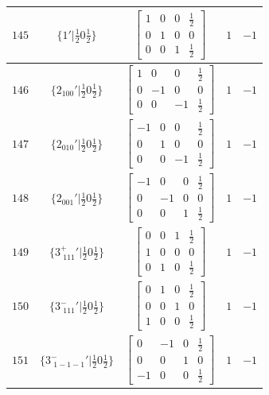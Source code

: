 \documentclass[fleqn,8pt]{jsarticle}
\begin{document}
\begin{longtable}{ccccc}
$ 145 $ & $ \{1{}'|\frac{1}{2} 0 \frac{1}{2}\} $ & $ \begin{bmatrix} 1 & 0 & 0 & \frac{1}{2} \\ 0 & 1 & 0 & 0 \\ 0 & 0 & 1 & \frac{1}{2} \end{bmatrix} $ & $ 1 $ & $ -1 $ \\ \hline
$ 146 $ & $ \{2{}_{100}{}'|\frac{1}{2} 0 \frac{1}{2}\} $ & $ \begin{bmatrix} 1 & 0 & 0 & \frac{1}{2} \\ 0 & -1 & 0 & 0 \\ 0 & 0 & -1 & \frac{1}{2} \end{bmatrix} $ & $ 1 $ & $ -1 $ \\ \hline
$ 147 $ & $ \{2{}_{010}{}'|\frac{1}{2} 0 \frac{1}{2}\} $ & $ \begin{bmatrix} -1 & 0 & 0 & \frac{1}{2} \\ 0 & 1 & 0 & 0 \\ 0 & 0 & -1 & \frac{1}{2} \end{bmatrix} $ & $ 1 $ & $ -1 $ \\ \hline
$ 148 $ & $ \{2{}_{001}{}'|\frac{1}{2} 0 \frac{1}{2}\} $ & $ \begin{bmatrix} -1 & 0 & 0 & \frac{1}{2} \\ 0 & -1 & 0 & 0 \\ 0 & 0 & 1 & \frac{1}{2} \end{bmatrix} $ & $ 1 $ & $ -1 $ \\ \hline
$ 149 $ & $ \{3^{+}_{\,\,111}{}'|\frac{1}{2} 0 \frac{1}{2}\} $ & $ \begin{bmatrix} 0 & 0 & 1 & \frac{1}{2} \\ 1 & 0 & 0 & 0 \\ 0 & 1 & 0 & \frac{1}{2} \end{bmatrix} $ & $ 1 $ & $ -1 $ \\ \hline
$ 150 $ & $ \{3^{-}_{\,\,111}{}'|\frac{1}{2} 0 \frac{1}{2}\} $ & $ \begin{bmatrix} 0 & 1 & 0 & \frac{1}{2} \\ 0 & 0 & 1 & 0 \\ 1 & 0 & 0 & \frac{1}{2} \end{bmatrix} $ & $ 1 $ & $ -1 $ \\ \hline
$ 151 $ & $ \{3^{-}_{\,\,1-1-1}{}'|\frac{1}{2} 0 \frac{1}{2}\} $ & $ \begin{bmatrix} 0 & -1 & 0 & \frac{1}{2} \\ 0 & 0 & 1 & 0 \\ -1 & 0 & 0 & \frac{1}{2} \end{bmatrix} $ & $ 1 $ & $ -1 $ \\ \hline

\end{longtable}
\end{document}
